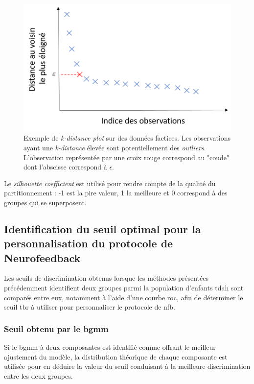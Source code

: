 \begin{figure}[h!]
  \centering
	\includegraphics[width=0.7\linewidth]{figures/chapter-4/tbr-k-distance-plot-example} 
  \caption[Exemple de \textit{k-distance plot} sur des données factices.]{Exemple de \textit{k-distance plot} sur des données factices. Les observations 
	ayant une \textit{k-distance} élevée sont potentiellement
	des \textit{outliers}. L'observation représentée par une croix rouge correspond au "coude" dont l'abscisse correspond à $\epsilon$.} 
	\label{Figure:tbr_k_distance_plot_example} 
\end{figure}

Le \textit{silhouette coefficient} est utilisé pour rendre compte de la qualité du partitionnement : -1 est la pire valeur, 1 la meilleure et 0
correspond à des groupes qui se superposent.

\subsection{Identification du seuil optimal pour la personnalisation du protocole de Neurofeedback}

Les seuils de discrimination obtenus lorsque les méthodes présentées précédemment identifient deux groupes parmi la population d'enfants \gls{tdah} 
sont comparés entre eux, notamment à l'aide d'une courbe \gls{roc}, afin de déterminer le seuil \gls{tbr} à utiliser pour personnaliser le protocole de \gls{nfb}. 

\subsubsection{Seuil obtenu par le \gls{bgmm}}
Si le \gls{bgmm} à deux composantes est identifié comme offrant le meilleur ajustement du modèle, la distribution théorique de chaque composante 
est utilisée pour en déduire la valeur du seuil conduisant à la meilleure discrimination entre les deux groupes. 

